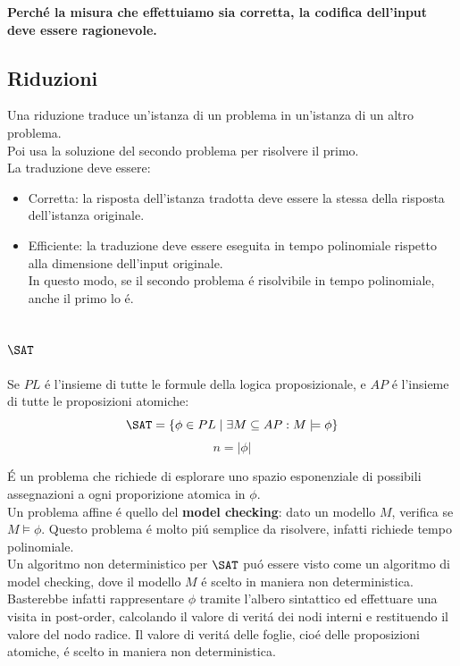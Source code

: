 \textbf{Perché la misura che effettuiamo sia corretta, la codifica dell'input deve essere ragionevole.} \\



\subsection{Riduzioni}
Una riduzione traduce un'istanza di un problema in un'istanza di un altro problema. \\
Poi usa la soluzione del secondo problema per risolvere il primo. \\
La traduzione deve essere:
\begin{itemize}
    \item Corretta: la risposta dell'istanza tradotta deve essere la stessa della risposta dell'istanza originale.
    \item Efficiente: la traduzione deve essere eseguita in tempo polinomiale rispetto alla dimensione dell'input originale. \\
    In questo modo, se il secondo problema é risolvibile in tempo polinomiale, anche il primo lo é.
\end{itemize}



\subsection{$\SAT$}
\label{problema:sat}
Se $PL$ é l'insieme di tutte le formule della logica proposizionale, e $AP$ é l'insieme di tutte le proposizioni atomiche:
\[
\SAT = \{ \phi \in PL \mid \exists M \subseteq AP : M \models \phi \} 
\]
\[
n = |\phi|
\]

É un problema che richiede di esplorare uno spazio esponenziale di possibili assegnazioni a ogni proporizione atomica in $\phi$. \\
Un problema affine é quello del \textbf{model checking}: dato un modello $M$, verifica se $M \models \phi$.
Questo problema é molto piú semplice da risolvere, infatti richiede tempo polinomiale. \\
Un algoritmo non deterministico per $\SAT$ puó essere visto come un algoritmo di model checking, 
dove il modello $M$ é scelto in maniera non deterministica. \\
Basterebbe infatti rappresentare $\phi$ tramite l'albero sintattico ed effettuare una visita in post-order,
calcolando il valore di veritá dei nodi interni e restituendo il valore del nodo radice.
Il valore di veritá delle foglie, cioé delle proposizioni atomiche, é scelto in maniera non deterministica.


